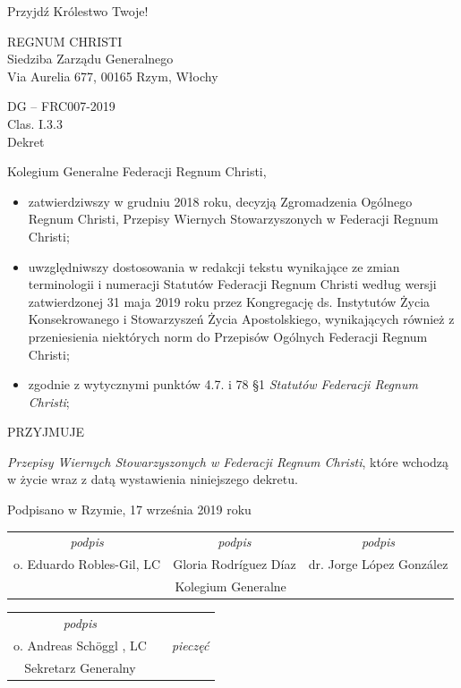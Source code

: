﻿\documentclass{report}
\begin{document}
\begin{framed}
\begin{footnotesize}
\begin{center}
Przyjdź Królestwo Twoje!


REGNUM CHRISTI\\
Siedziba Zarządu Generalnego\\
Via Aurelia 677, 00165 Rzym, Włochy
\end{center}
 
DG – FRC007-2019\\
Clas. I.3.3\\
Dekret
 
Kolegium Generalne Federacji Regnum Christi,


\begin{itemize}


\item zatwierdziwszy w grudniu 2018 roku, decyzją Zgromadzenia Ogólnego Regnum Christi, Przepisy Wiernych Stowarzyszonych w Federacji Regnum Christi;


\item uwzględniwszy dostosowania w redakcji tekstu wynikające ze zmian terminologii i numeracji Statutów Federacji Regnum Christi według wersji zatwierdzonej 31 maja 2019 roku przez Kongregację ds. Instytutów Życia Konsekrowanego i Stowarzyszeń Życia Apostolskiego, wynikających również z przeniesienia niektórych norm do Przepisów Ogólnych Federacji Regnum Christi;


\item zgodnie z wytycznymi punktów 4.7. i 78 \S{}1 {\em Statutów Federacji Regnum Christi};


\end{itemize}


\begin{center} 
PRZYJMUJE
\end{center}
 
{\em Przepisy Wiernych Stowarzyszonych w Federacji Regnum Christi}, które wchodzą w życie wraz z datą wystawienia niniejszego dekretu.
 
\begin{center}
Podpisano w Rzymie, 17 września 2019 roku


\begin{tabular}{ c c c }
{\em podpis} & {\em podpis} & {\em podpis} \\
o. Eduardo Robles-Gil, LC & Gloria Rodríguez Díaz & dr. Jorge López González \\
\multicolumn{3}{c}{Kolegium Generalne} 
\end{tabular}


\begin{tabular}{ c c c }
{\em podpis} & & \\
o. Andreas Schöggl , LC & & {\em pieczęć} \\
Sekretarz Generalny & & 
\end{tabular}


\end{center}


\end{footnotesize}
\end{framed}
 
\end{document}
